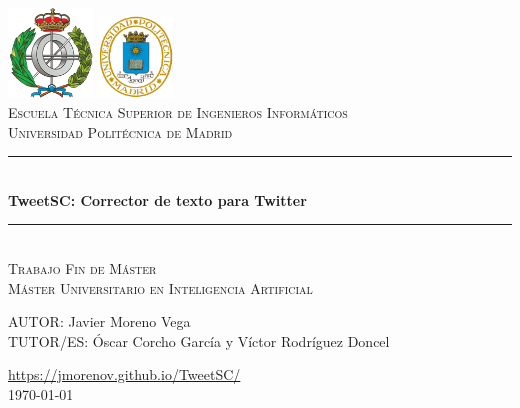 \documentclass[spanish,12pt, a4paper,twoside]{paper}
\begin{document}
\begin{titlepage}

\newcommand{\HRule}{\rule{\linewidth}{0.5mm}} %

\center %
 
\includegraphics[width=2.25cm]{recursos/logoFi.png}
  \hspace{8cm}
\includegraphics[width=2cm]{recursos/logoupm.png}
\\[1cm]

\textsc{\Large Escuela Técnica Superior de Ingenieros Informáticos}\\[0.5cm]
\textsc{\large Universidad Politécnica de Madrid}
\\[3cm]


 \HRule \\[0.4cm]
{ \huge \bfseries TweetSC: Corrector de texto para Twitter}\\[0.4cm] %
\HRule \\[2.5cm]

\textsc{\LARGE Trabajo Fin de Máster}\\[0.5cm] 
\textsc{\Large Máster Universitario en Inteligencia Artificial }\\[2.5cm]

\begin{flushright}
\large
AUTOR: Javier Moreno Vega\\
TUTOR/ES: Óscar Corcho García y \linebreak
                    Víctor Rodríguez Doncel
\end{flushright}


{{\url{https://jmorenov.github.io/TweetSC/}}}\\[1cm]


{ {\today}}\\[1cm]

\vfill %

\end{titlepage}
\end{document}
